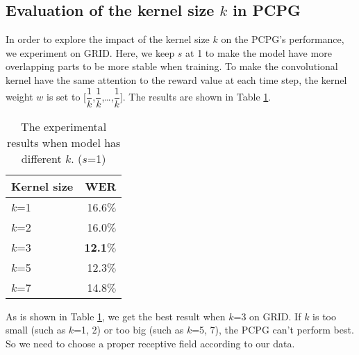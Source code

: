 \documentclass{bmvc2k}
\begin{document}
	\subsection{Evaluation of the kernel size $k$ in PCPG} \label{section4.2}
	\vspace{-0.20cm}
	In order to explore the impact of the kernel size $k$ on the PCPG's performance, we experiment on GRID. Here, we keep $s$ at 1 to make the model have more overlapping parts to be more stable when training. To make the convolutional kernel have the same attention to the reward value at each time step, the kernel weight $w$ is set to  [$\dfrac{1}{k}$,$\dfrac{1}{k}$,\dots,$\dfrac{1}{k}$]. The results are shown in Table \ref{table2}.
	\begin{table}[H]
		\vspace{-0.3cm}  %
		\setlength{\abovecaptionskip}{-0.0cm}   %
		\setlength{\belowcaptionskip}{-0.4cm} 
		\centering
		\begin{tabular}{lr}    
			\hline
			\hline
			Kernel size\centering      &     WER   \\
			\hline
			$k$=1& 16.6$\%$\\
			$k$=2 &16.0$\%$ \\
			$k$=3&\textbf{12.1}$\%$ \\
			$k$=5 & 12.3$\%$ \\  
			$k$=7&14.8$\%$ \\
			\hline
			\hline
		\end{tabular}
		\caption{The experimental results when model has different $k$. ($s$=1)} \label{table2}
		
	\end{table}
	As is shown in Table \ref{table2}, we get the best result when $k$=3 on GRID. If $k$ is too small (such as $k$=1, 2) or too big (such as $k$=5, 7), the PCPG can't perform best. So we need to choose a proper receptive field according to our data. 
	\vspace{-0.4cm}
\end{document}
